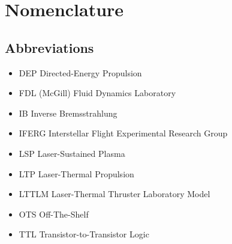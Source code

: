 \chapter*{Nomenclature}
\setlength{\columnsep}{1cm}
\newenvironment{nomtable}
    {
        \centering
        \tabularx{\columnwidth}{r>{\raggedright\arraybackslash}X}
    }
    {
        \endtabularx
    }
\newenvironment{nomlist}
    {
        \begin{itemize}[leftmargin=1.5cm]
            \raggedright
            \setlength{\parsep}{0pt}
            \setlength{\itemsep}{-4pt}
    }
    {
        \end{itemize}
    }
\begin{multicols}{2}
    \section*{Abbreviations}

    \begin{nomlist}
        \item[DEP]              Directed-Energy Propulsion
        \item[FDL]              (McGill) Fluid Dynamics Laboratory
        \item[IB]               Inverse Bremsstrahlung 
        \item[IFERG]            Interstellar Flight Experimental Research Group
        \item[LSP]              Laser-Sustained Plasma
        \item[LTP]              Laser-Thermal Propulsion
        \item[LTTLM]            Laser-Thermal Thruster Laboratory Model
        \item[OTS]              Off-The-Shelf
        \item[TTL]              Transistor-to-Transistor Logic
    \end{nomlist}


\end{multicols}
